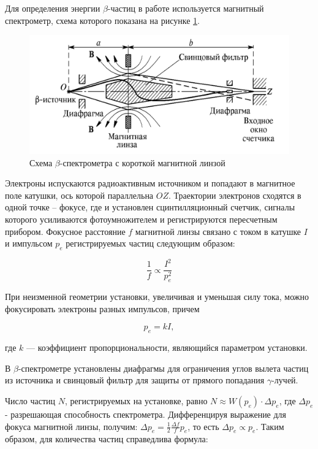 \documentclass[a4paper, 12pt]{article}
\begin{document}
    Для определения энергии $\beta$-частиц в работе используется магнитный спектрометр, схема которого показана на рисунке \ref{fig:installation}. 

    \begin{figure}[H]
        \centering
        \includegraphics[width = 0.5\linewidth]{images/installation.png}
        \caption{Схема $\beta$-спектрометра с короткой магнитной линзой}
        \label{fig:installation}
    \end{figure}
    
    Электроны испускаются радиоактивным источником и попадают в магнитное поле катушки, ось которой параллельна $OZ$. Траектории электронов сходятся в одной точке -- фокусе, где и установлен сцинтилляционный счетчик, сигналы которого усиливаются фотоумножителем и регистрируются пересчетным прибором. Фокусное расстояние $f$ магнитной линзы связано с током в катушке $I$ и импульсом $p_e$ регистрируемых частиц следующим образом:

    \begin{equation}
        \frac{1}{f} \propto \frac{I^2}{p_e^2}
    \end{equation}
		
    При неизменной геометрии установки, увеличивая и уменьшая силу тока, можно фокусировать электроны разных импульсов, причем 
	
    \begin{equation}
        \label{eq:pkI}
        p_e = kI,
    \end{equation}
	
    где $k$ --- коэффициент пропорциональности, являющийся параметром установки.

    В $\beta$-спектрометре установлены диафрагмы для ограничения углов вылета частиц из источника и свинцовый фильтр для защиты от прямого попадания $\gamma$-лучей. 

    Число частиц $N$, регистрируемых на установке, равно $N \approx W(p_e) \cdot \Delta p_e$, где $\Delta p_e$ - разрешающая способность спектрометра. Дифференцируя выражение для фокуса магнитной линзы, получим: $\Delta p_e = \frac{1}{2}\frac{\Delta f}{f}p_e$, то есть $\Delta p_e \propto p_e$. Таким образом, для количества частиц справедлива формула: 
\end{document}

